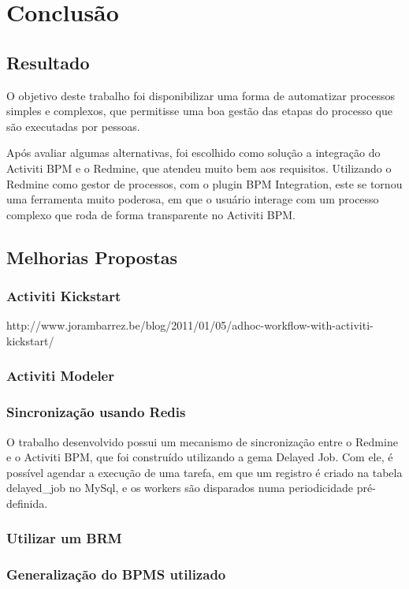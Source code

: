 \chapter{Conclusão}\label{chp:conclusao}

\section{Resultado}\label{sec:conclusao-resultados}

O objetivo deste trabalho foi disponibilizar uma forma de automatizar processos simples e complexos, que permitisse uma boa gestão das etapas do processo que são executadas por pessoas.

Após avaliar algumas alternativas, foi escolhido como solução a integração do Activiti BPM e o Redmine, que atendeu muito bem aos requisitos. Utilizando o Redmine como gestor de processos, com o plugin BPM Integration, este se tornou uma ferramenta muito poderosa, em que o usuário interage com um processo complexo que roda de forma transparente no Activiti BPM.

\section{Melhorias Propostas}\label{sec:conclusao-melhorias}

\subsection{Activiti Kickstart}

http://www.jorambarrez.be/blog/2011/01/05/adhoc-workflow-with-activiti-kickstart/

\subsection{Activiti Modeler}

\subsection{Sincronização usando Redis}

O trabalho desenvolvido possui um mecanismo de sincronização entre o Redmine e o Activiti BPM, que foi construído utilizando a gema Delayed Job. Com ele, é possível agendar a execução de uma tarefa, em que um registro é criado na tabela delayed_job no MySql, e os workers são disparados numa periodicidade pré-definida. 

\subsection{Utilizar um BRM}

\subsection{Generalização do BPMS utilizado}